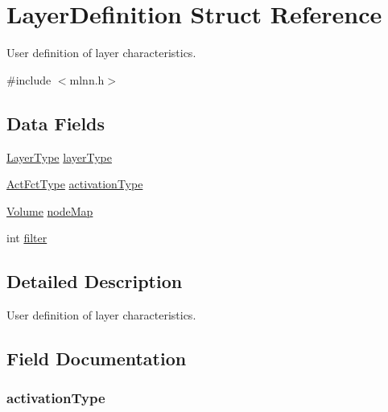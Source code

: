 \hypertarget{struct_layer_definition}{}\section{Layer\+Definition Struct Reference}
\label{struct_layer_definition}


User definition of layer characteristics.  




{\ttfamily \#include $<$mlnn.\+h$>$}

\subsection*{Data Fields}
\begin{DoxyCompactItemize}
\item 
\hyperlink{mlnn_8h_a56943a0946e5f15e5e58054b8e7a04a4}{Layer\+Type} \hyperlink{struct_layer_definition_a0c96bb06d0bfebab22c9cc28fdb27184}{layer\+Type}
\item 
\hyperlink{mlnn_8h_a56b0419d049f390f332329193f952b41}{Act\+Fct\+Type} \hyperlink{struct_layer_definition_a665950ae2120b534655bb987d3953953}{activation\+Type}
\item 
\hyperlink{struct_volume}{Volume} \hyperlink{struct_layer_definition_a8cd81e74b0e3a0cfb1a4608fcbf72b38}{node\+Map}
\item 
int \hyperlink{struct_layer_definition_af0122ee4312107103b580a98c74a4ea6}{filter}
\end{DoxyCompactItemize}


\subsection{Detailed Description}
User definition of layer characteristics. 

\subsection{Field Documentation}
\hypertarget{struct_layer_definition_a665950ae2120b534655bb987d3953953}{}
\subsubsection[{activation\+Type}]{ activation\+Type}\label{struct_layer_definition_a665950ae2120b534655bb987d3953953}
\hypertarget{struct_layer_definition_af0122ee4312107103b580a98c74a4ea6}{}
